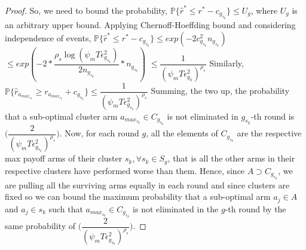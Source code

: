 \begin{proof}
	So, we need to bound the probability,
\newline\hspace*{4em} $\mathbb{P}\lbrace\hat{r}^{*}\leq r^{*} - c_{g_{s_{k}}}\rbrace\leq U_{g}$, where $U_{g}$ is an  arbitrary upper bound.
\newline
Applying Chernoff-Hoeffding bound and considering independence of events,
\newline
\newline\hspace*{0em} $\mathbb{P}\lbrace\hat{r}^{*}\leq r^{*} - c_{g_{s_{k}}}\rbrace\leq exp(-2c_{g_{s_{k}}}^{2}n_{g_{s_{k}}})$
\newline\hspace*{8em} $\leq exp(-2 * \dfrac{\rho_{s}\log ( \psi_{m}T\epsilon_{g_{s_{k}}}^{2})}{2 n_{g_{s_{k}}}} *n_{g_{s_{k}}})$
\newline\hspace*{8em} $\leq \dfrac{1}{(\psi_{m}T\epsilon_{g_{k}}^{2})^{\rho_{s}}}$
\newline
Similarly, $\mathbb{P}\lbrace\hat{r}_{a_{max_{s_{k}}}}\geq r_{a_{max_{s_{k}}}} + c_{g_{s_{k}}}\rbrace\leq \dfrac{1}{(\psi_{m}T\epsilon_{g_{s_{k}}}^{2})^{\rho_{s}}}$
\newline
Summing, the two up, the probability that a sub-optimal cluster arm $a_{max_{s_{k}}}\in C_{g_{s_{k}}}$ is not eliminated in $g_{s_{k}}$-th round is  $\bigg(\dfrac{2}{(\psi_{m}T\epsilon_{g_{s_{k}}}^{2})^{\rho_{s}}}\bigg)$. 
\newline Now, for each round $g$, all the elements of $C_{g_{s_{k}}}$ are the respective max payoff arms of their cluster $s_{k}, \forall s_{k}\in S_{g}$, that is all the other arms in their respective clusters have performed worse than them. Hence, since $A\supset C_{g_{s_{k}}}$, we are pulling all the surviving arms equally in each round and since clusters are fixed so we can bound the maximum probability that a sub-optimal arm $a_{j}\in A$  and $a_{j}\in s_{k}$ such that $a_{max_{s_{k}}}\in C_{g_{s_{k}}}$ is not eliminated in the $g$-th round by the same probability of $\bigg(\dfrac{2}{(\psi_{m}T\epsilon_{g_{s_{k}}}^{2})^{\rho_{s}}}\bigg)$. 

\end{proof}
